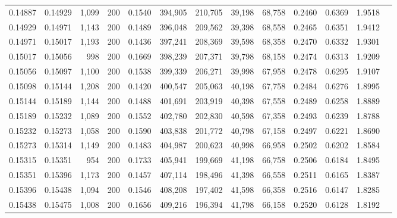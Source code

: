 \begin{tabular}{rrrrrrrrrrrrr}
0.14887 & 0.14929 & 1,099 & 200 &                                     0.1540 & 394,905 & 210,705 &  39,198 &  68,758 & 0.2460 & 0.6369 & 1.9518 \\
0.14929 & 0.14971 & 1,143 & 200 &                                     0.1489 & 396,048 & 209,562 &  39,398 &  68,558 & 0.2465 & 0.6351 & 1.9412 \\
0.14971 & 0.15017 & 1,193 & 200 &                                     0.1436 & 397,241 & 208,369 &  39,598 &  68,358 & 0.2470 & 0.6332 & 1.9301 \\
0.15017 & 0.15056 &   998 & 200 &                                     0.1669 & 398,239 & 207,371 &  39,798 &  68,158 & 0.2474 & 0.6313 & 1.9209 \\
0.15056 & 0.15097 & 1,100 & 200 &                                     0.1538 & 399,339 & 206,271 &  39,998 &  67,958 & 0.2478 & 0.6295 & 1.9107 \\
0.15098 & 0.15144 & 1,208 & 200 &                                     0.1420 & 400,547 & 205,063 &  40,198 &  67,758 & 0.2484 & 0.6276 & 1.8995 \\
0.15144 & 0.15189 & 1,144 & 200 &                                     0.1488 & 401,691 & 203,919 &  40,398 &  67,558 & 0.2489 & 0.6258 & 1.8889 \\
0.15189 & 0.15232 & 1,089 & 200 &                                     0.1552 & 402,780 & 202,830 &  40,598 &  67,358 & 0.2493 & 0.6239 & 1.8788 \\
0.15232 & 0.15273 & 1,058 & 200 &                                     0.1590 & 403,838 & 201,772 &  40,798 &  67,158 & 0.2497 & 0.6221 & 1.8690 \\
0.15273 & 0.15314 & 1,149 & 200 &                                     0.1483 & 404,987 & 200,623 &  40,998 &  66,958 & 0.2502 & 0.6202 & 1.8584 \\
0.15315 & 0.15351 &   954 & 200 &                                     0.1733 & 405,941 & 199,669 &  41,198 &  66,758 & 0.2506 & 0.6184 & 1.8495 \\
0.15351 & 0.15396 & 1,173 & 200 &                                     0.1457 & 407,114 & 198,496 &  41,398 &  66,558 & 0.2511 & 0.6165 & 1.8387 \\
0.15396 & 0.15438 & 1,094 & 200 &                                     0.1546 & 408,208 & 197,402 &  41,598 &  66,358 & 0.2516 & 0.6147 & 1.8285 \\
0.15438 & 0.15475 & 1,008 & 200 &                                     0.1656 & 409,216 & 196,394 &  41,798 &  66,158 & 0.2520 & 0.6128 & 1.8192 \\

\end{tabular}

